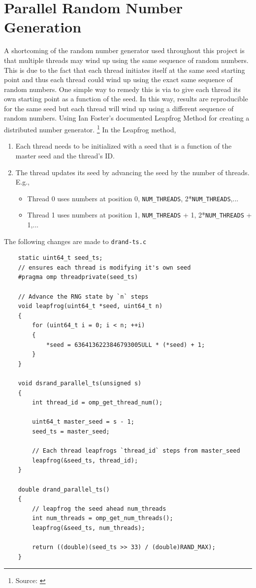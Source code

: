 \documentclass{article}
\newcommand{\MYhref}[3][blue]{\href{#2}{\color{#1}{#3}}}%
\begin{document}
\section{Parallel Random Number Generation}
A shortcoming of the random number generator used throughout this project is that multiple threads 
may wind up using the same sequence of random numbers. This is due to the fact that each thread initiates itself 
at the same seed starting point and thus each thread could wind up using the exact same sequence of random numbers. 
One simple way to remedy this is via to give each thread its own starting point as a function of the seed. In this way, 
results are reproducible for the same seed but each thread will wind up using a different sequence of random numbers. 
Using Ian Foster's documented Leapfrog Method for creating a distributed number generator.
\footnote{Source: \MYhref{https://www.mcs.anl.gov/\~itf/dbpp/text/node116.html}{https://www.mcs.anl.gov/~itf/dbpp/text/node116.html}}
In the Leapfrog method, 
\begin{enumerate}
    \item Each thread needs to be initialized with a seed that is a function of the master seed and the thread's ID.
    \item The thread updates its seed by advancing the seed by the number of threads. E.g.,
    \begin{itemize}
        \item Thread 0 uses numbers at position 0, \texttt{NUM\_THREADS}, 2*\texttt{NUM\_THREADS},...
        \item Thread 1 uses numbers at position 1, \texttt{NUM\_THREADS} + 1, 2*\texttt{NUM\_THREADS} + 1,...
    \end{itemize}
\end{enumerate}
The following changes are made to \texttt{drand-ts.c}
\begin{lstlisting}
    static uint64_t seed_ts;
    // ensures each thread is modifying it's own seed
    #pragma omp threadprivate(seed_ts)
    
    // Advance the RNG state by `n` steps
    void leapfrog(uint64_t *seed, uint64_t n)
    {
        for (uint64_t i = 0; i < n; ++i)
        {
            *seed = 6364136223846793005ULL * (*seed) + 1;
        }
    }
    
    void dsrand_parallel_ts(unsigned s)
    {
        int thread_id = omp_get_thread_num();
    
        uint64_t master_seed = s - 1;
        seed_ts = master_seed;
    
        // Each thread leapfrogs `thread_id` steps from master_seed
        leapfrog(&seed_ts, thread_id);
    }
    
    double drand_parallel_ts()
    {
        // leapfrog the seed ahead num_threads
        int num_threads = omp_get_num_threads();
        leapfrog(&seed_ts, num_threads);
    
        return ((double)(seed_ts >> 33) / (double)RAND_MAX);
    }
\end{lstlisting}
\end{document}
